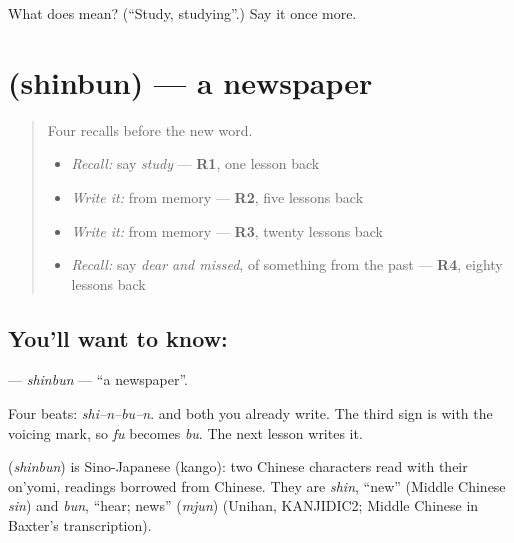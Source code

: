 \begin{tcolorbox}[breakable,colback=teal!4,colframe=teal!35!black,title={Before you move on}]
What does  mean? (\textquotedblleft{}Study, studying\textquotedblright{}.) Say it once more.
\end{tcolorbox}
\section[\texorpdfstring{\ja{しんぶん} (shinbun)}{しんぶん (shinbun)}]{ (shinbun) — a newspaper}

\label{lesson:JA-C134-shinbun}



\begin{quote}
Four recalls before the new word.

\begin{itemize}
\raggedright
  \item \emph{Recall:} say \emph{study} — \textbf{R1}, one lesson back
  \item \emph{Write it:} \textbf{} from memory — \textbf{R2}, five lessons back
  \item \emph{Write it:} \textbf{} from memory — \textbf{R3}, twenty lessons back
  \item \emph{Recall:} say \emph{dear and missed}, of something from the past — \textbf{R4}, eighty lessons back
\end{itemize}
\end{quote}

\subsection*{You'll want to know: }
\textbf{} — \emph{shinbun} — \textquotedblleft{}a newspaper\textquotedblright{}.

Four beats: \emph{shi–n–bu–n}. \textbf{} and both \textbf{} you already write. The third sign is \textbf{} with the voicing mark, so \emph{fu} becomes \emph{bu}. The next lesson writes it.

\begin{cousinweb}
\textbf{} (\emph{shinbun}) is Sino-Japanese (kango): two Chinese characters read with their on'yomi, readings borrowed from Chinese. They are \emph{shin}, \textquotedblleft{}new\textquotedblright{} (Middle Chinese \emph{sin}) and \emph{bun}, \textquotedblleft{}hear; news\textquotedblright{} (\emph{mjun}) (Unihan, KANJIDIC2; Middle Chinese in Baxter's transcription).
\end{cousinweb}

